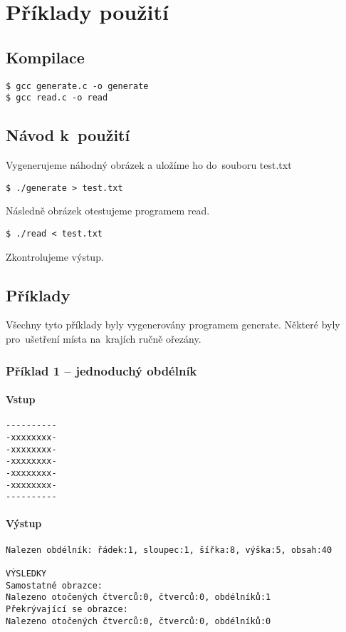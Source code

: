 \documentclass[12pt]{article}
\begin{document}
\section{Příklady použití}
\subsection{Kompilace}

\begin{verbatim}
$ gcc generate.c -o generate
$ gcc read.c -o read
\end{verbatim}

\subsection{Návod k~použití}
Vygenerujeme náhodný obrázek a uložíme ho do~souboru test.txt
\begin{verbatim}
$ ./generate > test.txt
\end{verbatim}

Následně obrázek otestujeme programem read.

\begin{verbatim}
$ ./read < test.txt
\end{verbatim}

Zkontrolujeme výstup.

\subsection{Příklady}
Všechny tyto příklady byly vygenerovány programem generate. Některé byly pro~ušetření místa na~krajích ručně ořezány. 

\subsubsection{Příklad 1 -- jednoduchý obdélník}

\paragraph{Vstup}
\begin{verbatim}
----------
-xxxxxxxx-
-xxxxxxxx-
-xxxxxxxx-
-xxxxxxxx-
-xxxxxxxx-
----------
\end{verbatim}
\paragraph{Výstup}
\begin{verbatim}
Nalezen obdélník: řádek:1, sloupec:1, šířka:8, výška:5, obsah:40 

VÝSLEDKY
Samostatné obrazce:
Nalezeno otočených čtverců:0, čtverců:0, obdélníků:1
Překrývající se obrazce:
Nalezeno otočených čtverců:0, čtverců:0, obdélníků:0
\end{verbatim}
\end{document}
